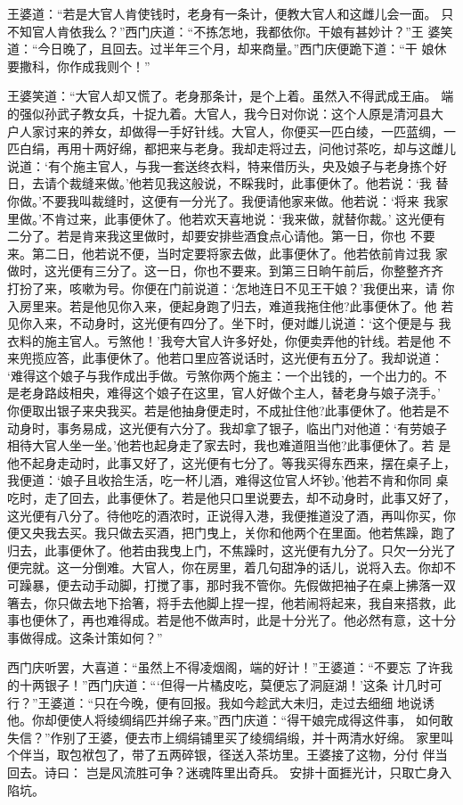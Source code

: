 王婆道：“若是大官人肯使钱时，老身有一条计，便教大官人和这雌儿会一面。
只不知官人肯依我么？”西门庆道：“不拣怎地，我都依你。干娘有甚妙计？”王
婆笑道：“今日晚了，且回去。过半年三个月，却来商量。”西门庆便跪下道：“干
娘休要撒科，你作成我则个！”

王婆笑道：“大官人却又慌了。老身那条计，是个上着。虽然入不得武成王庙。
端的强似孙武子教女兵，十捉九着。大官人，我今日对你说：这个人原是清河县大
户人家讨来的养女，却做得一手好针线。大官人，你便买一匹白绫，一匹蓝绸，一
匹白绢，再用十两好绵，都把来与老身。我却走将过去，问他讨茶吃，却与这雌儿
说道：‘有个施主官人，与我一套送终衣料，特来借历头，央及娘子与老身拣个好
日，去请个裁缝来做。’他若见我这般说，不睬我时，此事便休了。他若说：‘我
替你做。’不要我叫裁缝时，这便有一分光了。我便请他家来做。他若说：‘将来
我家里做。’不肯过来，此事便休了。他若欢天喜地说：‘我来做，就替你裁。’
这光便有二分了。若是肯来我这里做时，却要安排些酒食点心请他。第一日，你也
不要来。第二日，他若说不便，当时定要将家去做，此事便休了。他若依前肯过我
家做时，这光便有三分了。这一日，你也不要来。到第三日晌午前后，你整整齐齐
打扮了来，咳嗽为号。你便在门前说道：‘怎地连日不见王干娘？’我便出来，请
你入房里来。若是他见你入来，便起身跑了归去，难道我拖住他?此事便休了。他
若见你入来，不动身时，这光便有四分了。坐下时，便对雌儿说道：‘这个便是与
我衣料的施主官人。亏煞他！’我夸大官人许多好处，你便卖弄他的针线。若是他
不来兜揽应答，此事便休了。他若口里应答说话时，这光便有五分了。我却说道：
‘难得这个娘子与我作成出手做。亏煞你两个施主：一个出钱的，一个出力的。不
是老身路歧相央，难得这个娘子在这里，官人好做个主人，替老身与娘子浇手。’
你便取出银子来央我买。若是他抽身便走时，不成扯住他?此事便休了。他若是不
动身时，事务易成，这光便有六分了。我却拿了银子，临出门对他道：‘有劳娘子
相待大官人坐一坐。’他若也起身走了家去时，我也难道阻当他?此事便休了。若
是他不起身走动时，此事又好了，这光便有七分了。等我买得东西来，摆在桌子上，
我便道：‘娘子且收拾生活，吃一杯儿酒，难得这位官人坏钞。’他若不肯和你同
桌吃时，走了回去，此事便休了。若是他只口里说要去，却不动身时，此事又好了，
这光便有八分了。待他吃的酒浓时，正说得入港，我便推道没了酒，再叫你买，你
便又央我去买。我只做去买酒，把门曳上，关你和他两个在里面。他若焦躁，跑了
归去，此事便休了。他若由我曳上门，不焦躁时，这光便有九分了。只欠一分光了
便完就。这一分倒难。大官人，你在房里，着几句甜净的话儿，说将入去。你却不
可躁暴，便去动手动脚，打搅了事，那时我不管你。先假做把袖子在桌上拂落一双
箸去，你只做去地下拾箸，将手去他脚上捏一捏，他若闹将起来，我自来搭救，此
事也便休了，再也难得成。若是他不做声时，此是十分光了。他必然有意，这十分
事做得成。这条计策如何？”

西门庆听罢，大喜道：“虽然上不得凌烟阁，端的好计！”王婆道：“不要忘
了许我的十两银子！”西门庆道：“‘但得一片橘皮吃，莫便忘了洞庭湖！’这条
计几时可行？”王婆道：“只在今晚，便有回报。我如今趁武大未归，走过去细细
地说诱他。你却便使人将绫绸绢匹并绵子来。”西门庆道：“得干娘完成得这件事，
如何敢失信？”作别了王婆，便去市上绸绢铺里买了绫绸绢缎，并十两清水好绵。
家里叫个伴当，取包袱包了，带了五两碎银，径送入茶坊里。王婆接了这物，分付
伴当回去。诗曰：
岂是风流胜可争？迷魂阵里出奇兵。
安排十面捱光计，只取亡身入陷坑。

